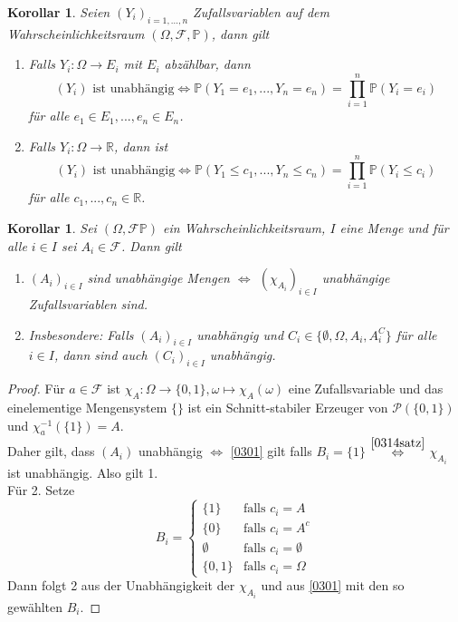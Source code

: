 \documentclass[10pt,a4paper]{article}
\newcommand{\R}{\ensuremath{\mathbb{R}}}
\newcommand{\potset}{\mathscr P}
\newcommand{\Prb}{\mathbb P}
\newcommand{\scF}{\ensuremath{\mathscr{F}}}
\theoremstyle{plain}
\newtheorem{kor}[theorem]{Korollar}
\theoremstyle{definition}
\theoremstyle{remark}
\begin{document}
	\begin{kor}
		Seien $(Y_i)_{i=1,...,n}$ Zufallsvariablen auf dem Wahrscheinlichkeitsraum $(\Omega,\scF,\Prb)$, dann gilt
		\begin{enumerate}[label=\alph*)]
			\item Falls $Y_i:\Omega\to E_i$ mit $E_i$ abzählbar, dann
			\[\text{$(Y_i)$ ist unabhängig}\Leftrightarrow\Prb(Y_1=e_1,...,Y_n=e_n)=\prod_{i=1}^n\Prb(Y_i=e_i)\]
			für alle $e_1\in E_1,...,e_n\in E_n$.
			\item Falls $Y_i:\Omega\to\R$, dann ist
			\[\text{$(Y_i)$ ist unabhängig}\Leftrightarrow\Prb(Y_1\leq c_1,...,Y_n\leq c_n)=\prod_{i=1}^n\Prb(Y_i\leq c_i)\]
			für alle $c_1,...,c_n\in\R$.
		\end{enumerate}
	\end{kor}

	\begin{kor}
		Sei $(\Omega,\scF\Prb)$ ein Wahrscheinlichkeitsraum, $I$ eine Menge und für alle $i\in I$ sei $A_i\in\scF$. Dann gilt
		\begin{enumerate}
			\item $(A_i)_{i\in I}$ sind unabhängige Mengen $\Leftrightarrow$ $(\chi_{A_i})_{i\in I}$ unabhängige Zufallsvariablen sind.
			\item Insbesondere: Falls $(A_i)_{i\in I}$ unabhängig und $C_i\in\{\emptyset,\Omega,A_i,A_i^C\}$ für alle $i\in I$, dann sind auch $(C_i)_{i\in I}$ unabhängig.
		\end{enumerate}
	\end{kor}
	\begin{proof}
		Für $a\in\scF$ ist $\chi_A:\Omega\to\{0,1\}, \omega\mapsto\chi_A(\omega)$ eine Zufallsvariable und das einelementige Mengensystem $\big\{\big\}$ ist ein Schnitt-stabiler Erzeuger von $\potset(\{0,1\})$ und $\chi_a^{-1}(\{1\})=A$.\\
		Daher gilt, dass $(A_i)$ unabhängig $\Leftrightarrow$ \ref{0301}  gilt falls $B_i=\{1\}$ $\overset{\ref{0314satz}}{\Leftrightarrow}$ $\chi_{A_i}$ ist unabhängig. Also gilt 1.\\
		Für 2. Setze
		\[B_i=\begin{cases}
		\{1\}&\text{falls $c_i=A$}\\
		\{0\}&\text{falls $c_i=A^c$}\\
		\emptyset&\text{falls $c_i=\emptyset$}\\
		\{0,1\}&\text{falls $c_i=\Omega$}
		\end{cases}\]
		Dann folgt 2 aus der Unabhängigkeit der $\chi_{A_i}$ und aus \ref{0301} mit den so gewählten $B_i$.
	\end{proof}
\end{document}
